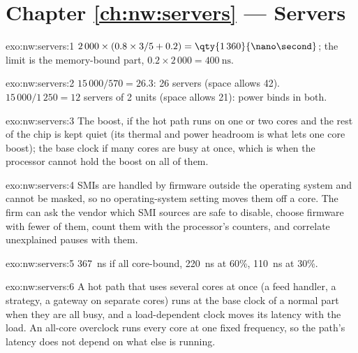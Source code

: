 \section*{Chapter \ref{ch:nw:servers} --- Servers}

\begin{solution}{exo:nw:servers:1}
$2\,000 \times (0.8 \times 3/5 + 0.2) = \qty{1\,360}{\nano\second}$; the limit is the memory-bound part, $0.2 \times 2\,000 =
\qty{400}{\nano\second}$.
\end{solution}

\begin{solution}{exo:nw:servers:2}
$15\,000/570 = 26.3$: 26 servers (space allows 42). $15\,000/1\,250 = 12$ servers of 2 units (space allows 21): power binds in both.
\end{solution}

\begin{solution}{exo:nw:servers:3}
The boost, if the hot path runs on one or two cores and the rest of the chip is kept quiet (its thermal and power headroom is what lets one
core boost); the base clock if many cores are busy at once, which is when the processor cannot hold the boost on all of them.
\end{solution}

\begin{solution}{exo:nw:servers:4}
SMIs are handled by firmware outside the operating system and cannot be masked, so no operating-system setting moves them off a core. The firm
can ask the vendor which SMI sources are safe to disable, choose firmware with fewer of them, count them with the processor's counters, and
correlate unexplained pauses with them.
\end{solution}

\begin{solution}{exo:nw:servers:5}
\qty{367}{\nano\second} if all core-bound, \qty{220}{\nano\second} at 60\%, \qty{110}{\nano\second} at 30\%.
\end{solution}

\begin{solution}{exo:nw:servers:6}
A hot path that uses several cores at once (a feed handler, a strategy, a gateway on separate cores) runs at the base clock of a normal part
when they are all busy, and a load-dependent clock moves its latency with the load. An all-core overclock runs every core at one fixed
frequency, so the path's latency does not depend on what else is running.
\end{solution}

